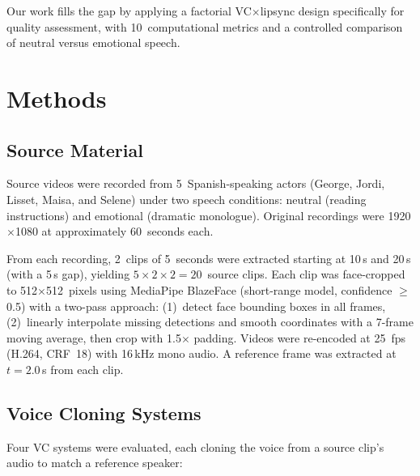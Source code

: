 \documentclass[11pt,a4paper]{article}
\begin{document}
Our work fills the gap by applying a factorial VC$\times$lipsync design specifically for quality assessment, with 10~computational metrics and a controlled comparison of neutral versus emotional speech.

\section{Methods}
\label{sec:methods}

\subsection{Source Material}

Source videos were recorded from 5~Spanish-speaking actors (George, Jordi, Lisset, Maisa, and Selene) under two speech conditions: neutral (reading instructions) and emotional (dramatic monologue).
Original recordings were 1920$\times$1080 at approximately 60~seconds each.

From each recording, 2~clips of 5~seconds were extracted starting at 10\,s and 20\,s (with a 5\,s gap), yielding $5 \times 2 \times 2 = 20$~source clips.
Each clip was face-cropped to 512$\times$512~pixels using MediaPipe BlazeFace (short-range model, confidence $\geq$0.5) with a two-pass approach: (1)~detect face bounding boxes in all frames, (2)~linearly interpolate missing detections and smooth coordinates with a 7-frame moving average, then crop with 1.5$\times$ padding.
Videos were re-encoded at 25~fps (H.264, CRF~18) with 16\,kHz mono audio.
A reference frame was extracted at $t=2.0$\,s from each clip.

\subsection{Voice Cloning Systems}

Four VC systems were evaluated, each cloning the voice from a source clip's audio to match a reference speaker:
\end{document}
